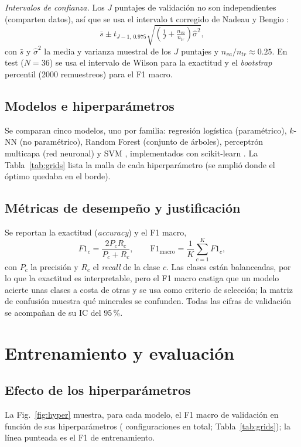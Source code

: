 \documentclass[journal]{IEEEtran}
\begin{document}
\emph{Intervalos de confianza.} Los $J$ puntajes de validación no son independientes (comparten datos), así que se usa el intervalo t corregido de Nadeau y Bengio \cite{nadeau2003}:
\begin{equation}
\bar s \pm t_{J-1,\,0.975}\sqrt{\left(\tfrac1J+\tfrac{n_{va}}{n_{tr}}\right)\hat\sigma^2},
\end{equation}
con $\bar s$ y $\hat\sigma^2$ la media y varianza muestral de los $J$ puntajes y $n_{va}/n_{tr}\approx0.25$. En test ($N=36$) se usa el intervalo de Wilson \cite{wilson1927} para la exactitud y el \emph{bootstrap} percentil \cite{efron1993} (2000 remuestreos) para el F1 macro.

\subsection{Modelos e hiperparámetros}\label{sec:modelos}
Se comparan cinco modelos, uno por familia: regresión logística (paramétrico), $k$-NN (no paramétrico), Random Forest \cite{breiman2001} (conjunto de árboles), perceptrón multicapa (red neuronal) y SVM \cite{cortes1995}, implementados con scikit-learn \cite{sklearn2011}. La Tabla~\ref{tab:grids} lista la malla de cada hiperparámetro (se amplió donde el óptimo quedaba en el borde).



\subsection{Métricas de desempeño y justificación}\label{sec:metr}
Se reportan la exactitud (\emph{accuracy}) y el F1 macro,
\begin{equation}
F1_c=\frac{2P_cR_c}{P_c+R_c},\qquad \mathrm{F1}_{\mathrm{macro}}=\frac1K\sum_{c=1}^{K}F1_c,
\end{equation}
con $P_c$ la precisión y $R_c$ el \emph{recall} de la clase $c$. Las clases están balanceadas, por lo que la exactitud es interpretable, pero el F1 macro castiga que un modelo acierte unas clases a costa de otras y se usa como criterio de selección; la matriz de confusión muestra qué minerales se confunden. Todas las cifras de validación se acompañan de su IC del 95\,\%.
\section{Entrenamiento y evaluación}\label{sec:res}
\subsection{Efecto de los hiperparámetros}\label{sec:hyper}
La Fig.~\ref{fig:hyper} muestra, para cada modelo, el F1 macro de validación en función de sus hiperparámetros ( configuraciones en total; Tabla~\ref{tab:grids}); la línea punteada es el F1 de entrenamiento.
\end{document}
